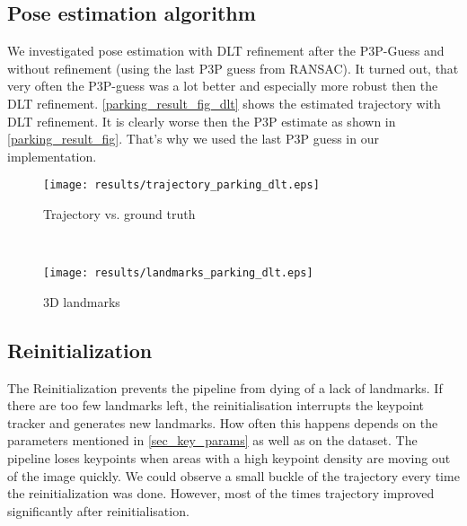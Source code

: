 \subsection{Pose estimation algorithm}
We investigated pose estimation with DLT refinement after the P3P-Guess and without refinement (using the last P3P guess from RANSAC). It turned out, that very often the P3P-guess was a lot better and especially more robust then the DLT refinement. \cref{parking_result_fig_dlt} shows the estimated trajectory with DLT refinement. It is clearly worse then the P3P estimate as shown in \cref{parking_result_fig}. That's why we used the last P3P guess in our implementation.
\begin{figure*}[ht!]
    \centering
    \begin{subfigure}[t]{0.5\textwidth}
        \centering
        \texttt{[image: results/trajectory\_parking\_dlt.eps]}
        \caption{Trajectory vs. ground truth}
    \end{subfigure}%
    ~ 
    \begin{subfigure}[t]{0.5\textwidth}
        \centering
        \texttt{[image: results/landmarks\_parking\_dlt.eps]}
        \caption{3D landmarks}
    \end{subfigure}
    \caption{Parking dataset results with DLT refinement}
		\label{parking_result_fig_dlt}
\end{figure*}

\subsection{Reinitialization}
The Reinitialization prevents the pipeline from dying of a lack of landmarks. If there are too few landmarks left, the reinitialisation interrupts the keypoint tracker and generates new landmarks. How often this happens depends on the parameters mentioned in \cref{sec_key_params} as well as on the dataset. The pipeline loses keypoints when areas with a high keypoint density are moving out of the image quickly. We could observe a small buckle of the trajectory every time the reinitialization was done. However, most of the times trajectory improved significantly after reinitialisation.
